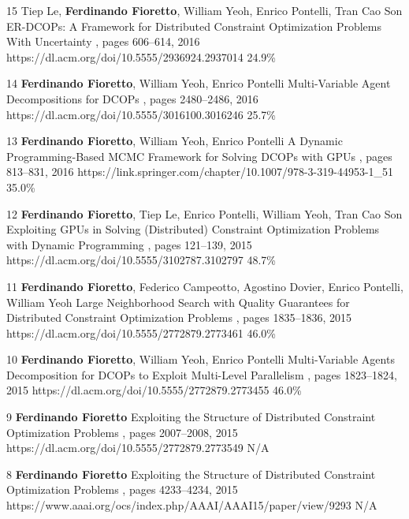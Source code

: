 \begin{pubs}
	\confentry 
		{15} %
		{Tiep Le, {\bf Ferdinando Fioretto}, William Yeoh, Enrico Pontelli, Tran Cao Son} 
		{ER-DCOPs: A Framework for Distributed Constraint Optimization Problems With Uncertainty} 
		{\procAAMAS,	pages 606--614, 2016}
		{https://dl.acm.org/doi/10.5555/2936924.2937014}
		{24.9\%}%

	\confentry 
		{14} %
		{{\bf Ferdinando Fioretto}, William Yeoh, Enrico Pontelli}
		{Multi-Variable Agent Decompositions for DCOPs}
		{\procAAAI, pages 2480--2486, 2016}
		{https://dl.acm.org/doi/10.5555/3016100.3016246}
		{25.7\%}%

	\confentry
		{13} %
		{{\bf Ferdinando Fioretto}, William Yeoh, Enrico Pontelli}
		{A Dynamic Programming-Based MCMC Framework for Solving DCOPs with GPUs}
		{\procCP, pages 813--831,	2016}
		{https://link.springer.com/chapter/10.1007/978-3-319-44953-1\_51}
		{35.0\%}%

	\confentry
		{12} %
		{{\bf Ferdinando Fioretto}, Tiep Le, Enrico Pontelli, William Yeoh, Tran Cao Son}
		{Exploiting GPUs in Solving (Distributed) Constraint Optimization Problems with Dynamic Programming}
		{\procCP, pages 121--139, 2015}
		{https://dl.acm.org/doi/10.5555/3102787.3102797}
		{48.7\%}%

	\confentry
		{11} %
		{{\bf Ferdinando Fioretto}, Federico Campeotto, Agostino Dovier, Enrico Pontelli, William Yeoh}
		{Large Neighborhood Search with Quality Guarantees for Distributed Constraint Optimization Problems}
		{\procAAMAS, pages 1835--1836, 2015}
		{https://dl.acm.org/doi/10.5555/2772879.2773461}
		{46.0\%}

	\confentry
		{10} %
		{{\bf Ferdinando Fioretto}, William Yeoh, Enrico Pontelli}
		{Multi-Variable Agents Decomposition for DCOPs to Exploit Multi-Level Parallelism}
		{\procAAMAS, pages 1823--1824, 2015}
		{https://dl.acm.org/doi/10.5555/2772879.2773455}
		{46.0\%}

	\confentry
		{9} %
		{{\bf Ferdinando Fioretto}}
		{Exploiting the Structure of Distributed Constraint Optimization Problems} 
		{\procAAMAS, pages 2007--2008, 2015}
		{https://dl.acm.org/doi/10.5555/2772879.2773549}
		{N/A}

	\confentry
		{8} %
		{{\bf Ferdinando Fioretto}} 
		{Exploiting the Structure of Distributed Constraint Optimization Problems}
		{\procAAAI,  pages 4233--4234, 2015}
		{https://www.aaai.org/ocs/index.php/AAAI/AAAI15/paper/view/9293}
		{N/A}


\end{pubs}
